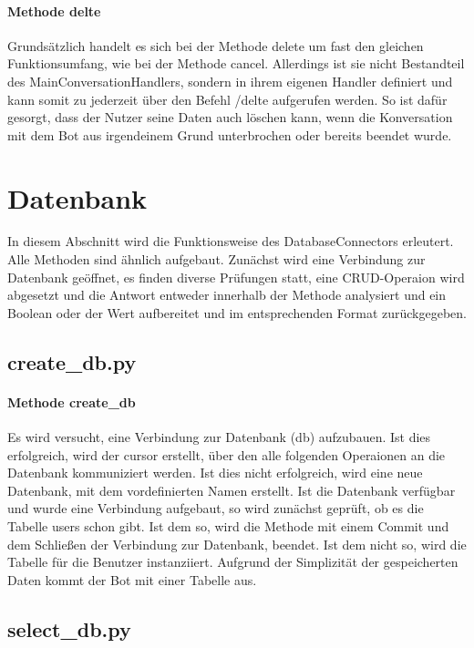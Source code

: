             \paragraph{Methode delte}
                Grundsätzlich handelt es sich bei der Methode delete um fast den gleichen Funktionsumfang, wie bei der Methode cancel. Allerdings ist sie nicht Bestandteil des Main\-ConversationHandlers, sondern in ihrem eigenen Handler definiert und kann somit zu jederzeit über den Befehl /delte aufgerufen werden. So ist dafür gesorgt, dass der Nutzer seine Daten auch löschen kann, wenn die Konversation mit dem Bot aus irgendeinem Grund unterbrochen oder bereits beendet wurde.


    \section{Datenbank}

        In diesem Abschnitt wird die Funktionsweise des Database\-Connectors erleutert. Alle Methoden sind ähnlich aufgebaut. Zunächst wird eine Verbindung zur Datenbank geöffnet, es finden diverse Prüfungen statt, eine CRUD-Operaion wird abgesetzt und die Antwort entweder innerhalb der Methode analysiert und ein Boolean oder der Wert aufbereitet und im entsprechenden Format zurückgegeben.
                
        \subsection{create\_db.py}
            \paragraph{Methode create\_db}
            Es wird versucht, eine Verbindung zur Datenbank (db) aufzubauen. Ist dies erfolgreich, wird der cursor erstellt, über den alle folgenden Operaionen an die Datenbank kommuniziert werden. Ist dies nicht erfolgreich, wird eine neue Datenbank, mit dem vordefinierten Namen erstellt. 
            Ist die Datenbank verfügbar und wurde eine Verbindung aufgebaut, so wird zunächst geprüft, ob es die Tabelle users schon gibt. Ist dem so, wird die Methode mit einem Commit und dem Schließen der Verbindung zur Datenbank, beendet. Ist dem nicht so, wird die Tabelle für die Benutzer instanziiert. Aufgrund der Simplizität der gespeicherten Daten kommt der Bot mit einer Tabelle aus.


        \subsection{select\_db.py}

